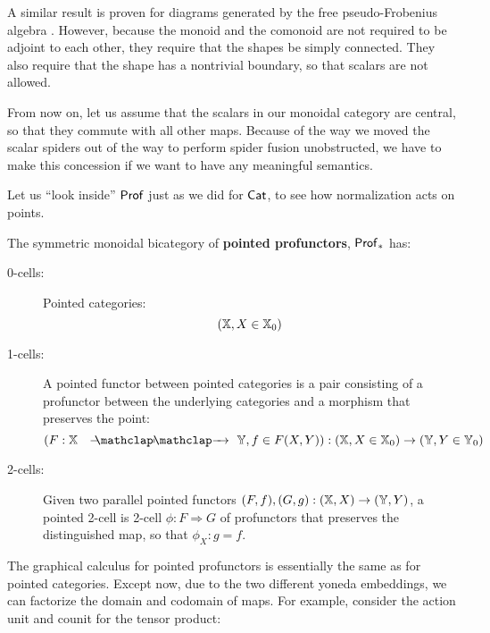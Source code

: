 A similar result is proven for diagrams generated by the free pseudo-Frobenius algebra \cite{dunn}.  However, because the monoid and the comonoid are not required to be adjoint to each other, they require that the shapes be simply connected.  They also require that the shape has a nontrivial boundary, so that scalars are not allowed.

From now on, let us assume that the scalars in our monoidal category are central, so that they commute with all other maps.  Because of the way we moved the scalar spiders out of the way to perform spider fusion unobstructed, we have to make this concession if we want to have any meaningful semantics.

Let us ``look inside'' ${\sf Prof}$ just as we did for ${\sf Cat}$, to see how normalization acts on points.
\begin{definition}
The symmetric monoidal bicategory of {\bf pointed profunctors}, ${\sf Prof}_*$ has:
\begin{description}
\item[0-cells:] Pointed categories:
$$(\mathbb{X}, X\in\mathbb{X}_0)$$
\item[1-cells:] A pointed functor  between pointed categories is a pair consisting of a profunctor between the underlying categories and a morphism that preserves the point:
$$(F:\X\proarrow\Y, f\in F(X,Y)):(\X, X\in\X_0)\to (\Y, Y\in\Y_0)$$
\item[2-cells:] Given two parallel pointed functors $(F, f),  (G, g):(\mathbb{X}, X)\to (\mathbb{Y},Y)$,
a pointed 2-cell is 2-cell $\phi:F\Rightarrow G$ of profunctors that preserves the distinguished map, so that $\phi_X:g=f$.
\end{description}
\end{definition}
The graphical calculus for pointed profunctors is essentially the same as for pointed categories.  Except now, due to the two different yoneda embeddings, we can factorize the domain and codomain of maps.  For example, consider the action unit and counit for the tensor product:
